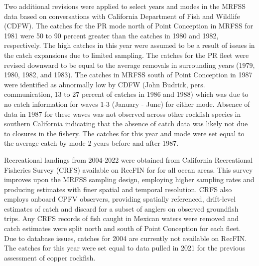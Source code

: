 \documentclass[11pt,
  english,
  letterpaper,
]{article}
\begin{document}
Two additional revisions were applied to select years and modes in the MRFSS data based on conversations with California Department of Fish and Wildlife (CDFW). The catches for the PR mode north of Point Conception in MRFSS for 1981 were 50 to 90 percent greater than the catches in 1980 and 1982, respectively. The high catches in this year were assumed to be a result of issues in the catch expansions due to limited sampling. The catches for the PR fleet were revised downward to be equal to the average removals in surrounding years (1979, 1980, 1982, and 1983). The catches in MRFSS south of Point Conception in 1987 were identified as abnormally low by CDFW (John Budrick, pers. communication, 13 to 27 percent of catches in 1986 and 1988) which was due to no catch information for waves 1-3 (January - June) for either mode. Absence of data in 1987 for these waves was not observed across other rockfish species in southern California indicating that the absence of catch data was likely not due to closures in the fishery. The catches for this year and mode were set equal to the average catch by mode 2 years before and after 1987.

Recreational landings from 2004-2022 were obtained from California Recreational Fisheries Survey (CRFS) available on RecFIN for for all ocean areas. This survey improves upon the MRFSS sampling design, employing higher sampling rates and producing estimates with finer spatial and temporal resolution. CRFS also employs onboard CPFV observers, providing spatially referenced, drift-level estimates of catch and discard for a subset of anglers on observed groundfish trips. Any CRFS records of fish caught in Mexican waters were removed and catch estimates were split north and south of Point Conception for each fleet. Due to database issues, catches for 2004 are currently not available on RecFIN. The catches for this year were set equal to data pulled in 2021 for the previous assessment of copper rockfish.
\end{document}
